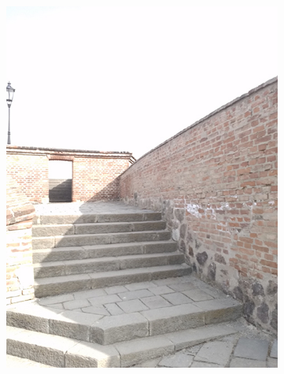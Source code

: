 \begin{figure}[t]
    \begin{subfigure}{0.3\textwidth}
        \includegraphics[width=\textwidth]{figures/capturing/align/image2}
    \end{subfigure}
    ~
    \begin{subfigure}{0.3\textwidth}

\end{subfigure}
\end{figure}
